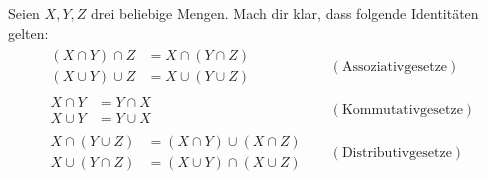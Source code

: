 \begin{aufg} \label{capcupgesetze}
Seien $X,Y,Z$ drei beliebige Mengen. Mach dir klar, dass folgende Identitäten gelten:
\begin{align*}
  \begin{split} (X \cap Y) \cap Z & = X \cap (Y \cap Z) \\
  (X \cup Y) \cup Z & = X \cup (Y \cup Z) \end{split} && (\text{Assoziativgesetze}) \\[1em]
  \begin{split} X \cap Y & = Y\cap X \\
  X \cup Y & = Y\cup X
 \end{split} && ( \text{Kommutativgesetze}) \\[1em]
  \begin{split} X \cap (Y \cup Z) & = (X\cap Y) \cup (X\cap Z) \\
   X \cup (Y\cap Z) & = (X\cup Y) \cap (X\cup Z) \end{split} && ( \text{Distributivgesetze}) 
\end{align*}
\end{aufg}





